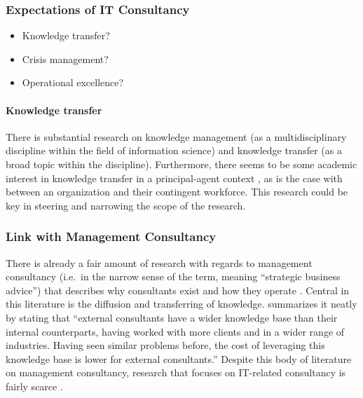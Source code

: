 \documentclass[12pt]{article}
\providecommand{\tightlist}{%
  \setlength{\itemsep}{0pt}\setlength{\parskip}{0pt}}
\begin{document}
\hypertarget{expectations-of-it-consultancy}{%
\subsubsection{Expectations of IT
Consultancy}\label{expectations-of-it-consultancy}}

\begin{itemize}
\tightlist
\item
  Knowledge transfer?
\item
  Crisis management?
\item
  Operational excellence?
\end{itemize}

\hypertarget{knowledge-transfer}{%
\paragraph{Knowledge transfer}\label{knowledge-transfer}}

There is substantial research on knowledge management (as a
multidisciplinary discipline within the field of information science)
and knowledge transfer (as a broad topic within the discipline).
Furthermore, there seems to be some academic interest in knowledge
transfer in a principal-agent context \citep{ning2008, haines2003}, as
is the case with between an organization and their contingent workforce.
This research could be key in steering and narrowing the scope of the
research.

\hypertarget{link-with-management-consultancy}{%
\subsubsection{Link with Management
Consultancy}\label{link-with-management-consultancy}}

There is already a fair amount of research with regards to management
consultancy (i.e.~in the narrow sense of the term, meaning ``strategic
business advice'') that describes why consultants exist
\citep{canback1998, sturdy2009} and how they operate
\citep{clark1998, bessant1995, whittle2006}. Central in this literature
is the diffusion and transferring of knowledge. \citet{canback1999}
summarizes it neatly by stating that ``external consultants have a wider
knowledge base than their internal counterparts, having worked with more
clients and in a wider range of industries. Having seen similar problems
before, the cost of leveraging this knowledge base is lower for external
consultants.'' Despite this body of literature on management
consultancy, research that focuses on IT-related consultancy is fairly
scarce \citep{bloomfield1995, nevo2007, swanson2010}.
\end{document}
